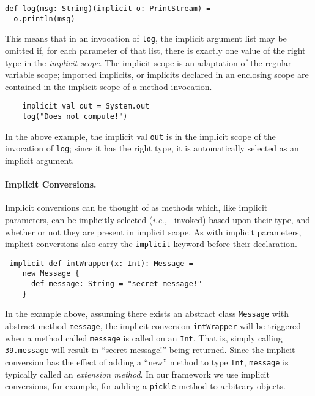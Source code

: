 \documentclass[preprint]{sigplanconf}
\newcommand{\ie}{{\em i.e.,~}}
\newcommand{\term}[1]{\mbox{\texttt{#1}}}
\begin{document}
\begin{lstlisting}
def log(msg: String)(implicit o: PrintStream) =
  o.println(msg)
\end{lstlisting}

This means that in an invocation of \term{log}, the implicit argument list may
be omitted if, for each parameter of that list, there is exactly one value of
the right type in the {\em implicit scope}. The implicit scope is an
adaptation of the regular variable scope; imported implicits, or implicits
declared in an enclosing scope are contained in the implicit scope of a method
invocation.

\begin{lstlisting}
    implicit val out = System.out
    log("Does not compute!")
\end{lstlisting}

In the above example, the implicit val \term{out} is in the implicit scope of
the invocation of \term{log}; since it has the right type, it is automatically
selected as an implicit argument.



\paragraph{Implicit Conversions.} Implicit conversions can be thought of as
methods which, like implicit parameters, can be implicitly selected (\ie
invoked) based upon their type, and whether or not they are present in
implicit scope. As with implicit parameters, implicit conversions also carry
the \term{implicit} keyword before their declaration.

\begin{lstlisting}
 implicit def intWrapper(x: Int): Message =
    new Message {
      def message: String = "secret message!"
    }
\end{lstlisting}

In the example above, assuming there exists an abstract class \term{Message}
with abstract method \term{message}, the implicit conversion
\term{intWrapper} will be triggered when a method called \term{message}
is called on an \term{Int}. That is, simply calling
\term{39.message} will result in ``secret message!'' being
returned. Since the implicit conversion has the effect of adding a
``new'' method to type \term{Int}, \term{message} is typically called an
{\em extension method}. In our framework we use implicit conversions,
for example, for adding a \term{pickle} method to arbitrary objects.
\end{document}
